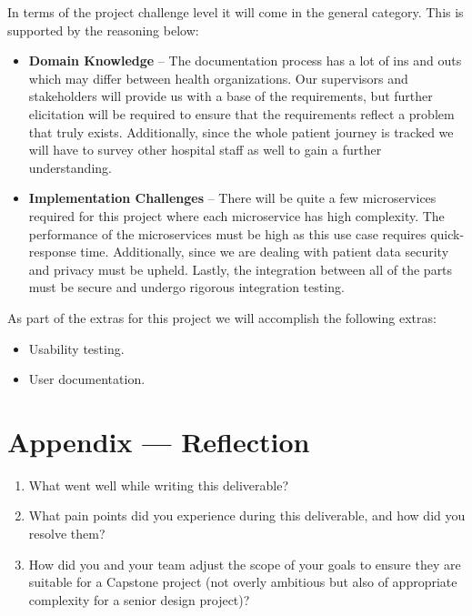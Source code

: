 \documentclass{article}
\begin{document}

In terms of the project challenge level it will come in the general category. This is supported by the reasoning below:

\begin{itemize}
    \item \textbf{Domain Knowledge} -- The documentation process has a lot of ins and outs which may differ between health organizations. Our supervisors and stakeholders will provide us with a base of the requirements, but further elicitation will be required to ensure that the requirements reflect a problem that truly exists. Additionally, since the whole patient journey is tracked we will have to survey other hospital staff as well to gain a further understanding.
    \item \textbf{Implementation Challenges} -- There will be quite a few microservices required for this project where each microservice has high complexity. The performance of the microservices must be high as this use case requires quick-response time. Additionally, since we are dealing with patient data security and privacy must be upheld. Lastly, the integration between all of the parts must be secure and undergo rigorous integration testing.
\end{itemize}

As part of the extras for this project we will accomplish the following extras:
\begin{itemize}
    \item Usability testing.
    \item User documentation.
\end{itemize}

\newpage{}

\section*{Appendix --- Reflection}




\begin{enumerate}
    \item What went well while writing this deliverable? 
    \item What pain points did you experience during this deliverable, and how
    did you resolve them?
    \item How did you and your team adjust the scope of your goals to ensure
    they are suitable for a Capstone project (not overly ambitious but also of
    appropriate complexity for a senior design project)?
\end{enumerate}  
\end{document}
